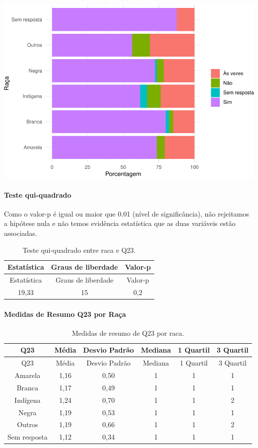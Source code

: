 \documentclass[]{article}
\let\oldparagraph\paragraph
\renewcommand{\paragraph}[1]{\oldparagraph{#1}\mbox{}}
\begin{document}
\begin{center}\includegraphics[width=0.75\linewidth]{relatorio_covid19_files/figure-latex/unnamed-chunk-575-1} \end{center}

\hypertarget{teste-qui-quadrado-50}{%
\paragraph{Teste qui-quadrado}\label{teste-qui-quadrado-50}}

Como o valor-p é igual ou maior que 0.01 (nível de significância), não rejeitamos a hipótese nula e não temos evidência estatística que as duas variáveis estão associadas.

\begin{longtable}[]{@{}ccc@{}}
\caption{\label{tab:unnamed-chunk-577}Teste qui-quadrado entre raca e Q23.}\tabularnewline
\toprule
Estatística & Graus de liberdade & Valor-p\tabularnewline
\midrule
\endfirsthead
\toprule
Estatística & Graus de liberdade & Valor-p\tabularnewline
\midrule
\endhead
19,33 & 15 & 0,2\tabularnewline
\bottomrule
\end{longtable}

\cleardoublepage

\hypertarget{medidas-de-resumo-q23-por-rauxe7a}{%
\paragraph{Medidas de Resumo Q23 por Raça}\label{medidas-de-resumo-q23-por-rauxe7a}}

\begin{longtable}[]{@{}cccccc@{}}
\caption{\label{tab:unnamed-chunk-578}Medidas de resumo de Q23 por raca.}\tabularnewline
\toprule
Q23 & Média & Desvio Padrão & Mediana & 1 Quartil & 3 Quartil\tabularnewline
\midrule
\endfirsthead
\toprule
Q23 & Média & Desvio Padrão & Mediana & 1 Quartil & 3 Quartil\tabularnewline
\midrule
\endhead
Amarela & 1,16 & 0,50 & 1 & 1 & 1\tabularnewline
Branca & 1,17 & 0,49 & 1 & 1 & 1\tabularnewline
Indígena & 1,24 & 0,70 & 1 & 1 & 2\tabularnewline
Negra & 1,19 & 0,53 & 1 & 1 & 1\tabularnewline
Outros & 1,19 & 0,66 & 1 & 1 & 2\tabularnewline
Sem resposta & 1,12 & 0,34 & 1 & 1 & 1\tabularnewline
\bottomrule
\end{longtable}
\end{document}
